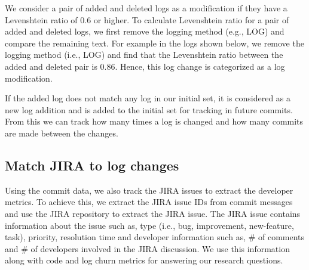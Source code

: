  We consider a pair of added and deleted logs as a modification if they have a Levenshtein ratio of 0.6 or higher. To calculate Levenshtein ratio for a pair of added and deleted logs, we first remove the logging method (e.g., LOG) and compare the remaining text. For example in the logs shown below, we remove the logging method (i.e., LOG) and find that the Levenshtein ratio between the added and deleted pair is 0.86. Hence, this log change is categorized as a log modification.  


If the added log does not match any log in our initial set, it is considered as a new log addition and is added to the initial set for tracking in future commits. From this we can track how many times a log is changed and how many commits are made between the changes. 


\subsection{Match JIRA to log changes}

Using the commit data, we also track the JIRA issues to extract the developer metrics. To achieve this, we extract the JIRA issue IDs from commit messages and use the JIRA repository to extract the JIRA issue. The JIRA issue contains information about the issue such as, type (i.e., bug, improvement, new-feature, task), priority, resolution time and developer information such as, \# of comments and \# of developers involved in the JIRA discussion. We use this information along with code and log churn metrics for answering our research questions. 




 







